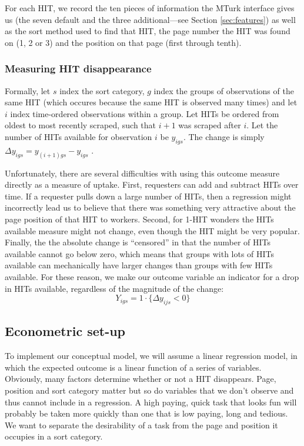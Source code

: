 \documentclass{acm_proc_article-sp}
\begin{document}
For each HIT, we record the ten pieces of information the MTurk
interface gives us (the seven default and the three additional---see
Section \ref{sec:features}) as well as the sort method used to find
that HIT, the page number the HIT was found on (1, 2 or 3) and the
position on that page (first through tenth).

\subsubsection{Measuring HIT disappearance}
Formally, let $s$ index the sort category, $g$ index the groups of
observations of the same HIT (which occures because the same HIT is
observed many times) and let $i$ index time-ordered observations
within a group. Let HITs be ordered from oldest to most recently
scraped, such that $i+1$ was scraped after $i$. Let the number of HITs
available for observation $i$ be $y_{igs}$.  The change is simply
$\Delta y_{igs} = y_{(i+1)gs} - y_{igs}$ .

Unfortunately, there are several difficulties with using this outcome
measure directly as a measure of uptake.  First, requesters can add
and subtract HITs over time. If a requester pulls down a large number
of HITs, then a regression might incorrectly lead us to believe that
there was something very attractive about the page position of that
HIT to workers.  Second, for 1-HIT wonders the HITs available measure
might not change, even though the HIT might be very popular. Finally,
the the absolute change is ``censored'' in that the number of HITs
available cannot go below zero, which means that groups with lots of
HITs available can  mechanically have larger changes than groups
with few HITs available. For these reason, we make our outcome
variable an indicator for a drop in HITs available, regardless of the
magnitude of the change:
\[Y_{igs} = 1\cdot \{\Delta y_{ijs} < 0\} \]

\subsection{Econometric set-up}
To implement our conceptual model, we will assume a linear regression
model, in which the expected outcome is a linear function of a series
of variables. Obviously, many factors determine whether or not a HIT
disappears.  Page, position and sort category matter but so do
variables that we don't observe and thus cannot include in a
regression. A high paying, quick task that looks fun will probably be
taken more quickly than one that is low paying, long and tedious.  We
want to separate the desirability of a task from the page and position
it occupies in a sort category.
\end{document}
